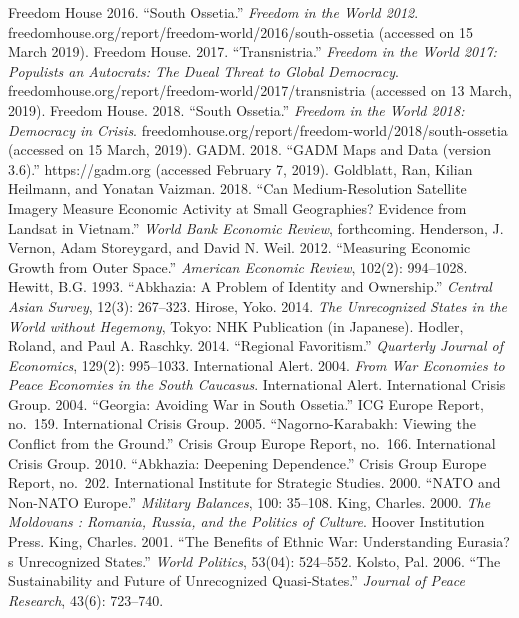 \documentclass[12pt,a4paper]{article}%
\begin{document}
\begin{thebibliography}{99}
\bibitem{} Freedom House 2016. ``South Ossetia.'' \textit{Freedom in the World 2012}. freedomhouse.org/report/freedom-world/2016/south-ossetia (accessed on 15 March 2019).
\bibitem{} Freedom House. 2017. ``Transnistria.'' \textit{Freedom in the World 2017: Populists an Autocrats: The Dueal Threat to Global Democracy}. freedomhouse.org/report/freedom-world/2017/transnistria (accessed on 13 March, 2019).
\bibitem{} Freedom House. 2018. ``South Ossetia.'' \textit{Freedom in the World 2018: Democracy in Crisis}. freedomhouse.org/report/freedom-world/2018/south-ossetia (accessed on 15 March, 2019).
\bibitem{} GADM. 2018. ``GADM Maps and Data (version 3.6).'' https://gadm.org (accessed February 7, 2019).
\bibitem{} Goldblatt, Ran, Kilian Heilmann, and Yonatan Vaizman. 2018. ``Can Medium-Resolution Satellite Imagery Measure Economic Activity at Small Geographies? Evidence from Landsat in Vietnam.'' \textit{World Bank Economic Review}, forthcoming.
\bibitem{} Henderson, J. Vernon, Adam Storeygard, and David N. Weil. 2012. ``Measuring Economic Growth from Outer Space.'' \textit{American Economic Review}, 102(2): 994--1028.
\bibitem{} Hewitt, B.G. 1993. ``Abkhazia: A Problem of Identity and Ownership.'' \textit{Central Asian Survey}, 12(3): 267--323.
\bibitem{} Hirose, Yoko. 2014. \textit{The Unrecognized States in the World without Hegemony}, Tokyo: NHK Publication (in Japanese). 
\bibitem{} Hodler, Roland, and Paul A. Raschky. 2014. ``Regional Favoritism.'' \textit{Quarterly Journal of Economics}, 129(2): 995--1033.
\bibitem{} International Alert. 2004. \textit{From War Economies to Peace Economies in the South Caucasus}. International Alert.
\bibitem{} International Crisis Group. 2004. ``Georgia: Avoiding War in South Ossetia.'' ICG Europe Report, no.\ 159.
\bibitem{} International Crisis Group. 2005. ``Nagorno-Karabakh: Viewing the Conflict from the Ground.'' Crisis Group Europe Report, no.\ 166.
\bibitem{} International Crisis Group. 2010. ``Abkhazia: Deepening Dependence.'' Crisis Group Europe Report, no.\ 202. 
\bibitem{} International Institute for Strategic Studies. 2000. ``NATO and Non-NATO Europe.'' \textit{Military Balances}, 100: 35--108.
\bibitem{} King, Charles. 2000. \textit{The Moldovans : Romania, Russia, and the Politics of Culture}. Hoover Institution Press.
\bibitem{} King, Charles. 2001. ``The Benefits of Ethnic War: Understanding Eurasia?s Unrecognized States.'' \textit{World Politics}, 53(04): 524--552.
\bibitem{} Kolsto, Pal. 2006. ``The Sustainability and Future of Unrecognized Quasi-States.'' \textit{Journal of Peace Research}, 43(6): 723--740.

\end{thebibliography}
\end{document}
